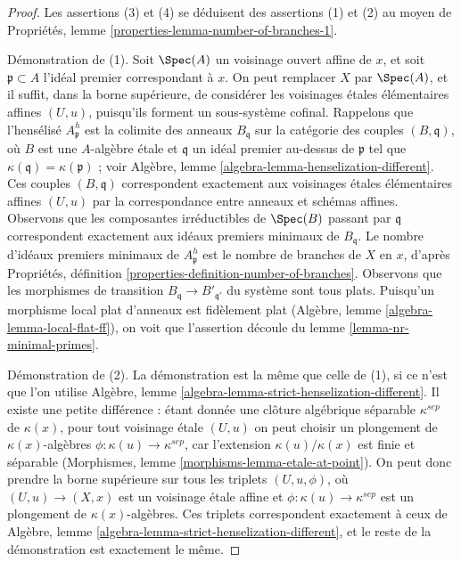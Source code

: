 \begin{proof}
Les assertions (3) et (4) se déduisent des assertions (1) et (2) au moyen de
Propriétés, lemme \ref{properties-lemma-number-of-branches-1}.

\medskip\noindent
Démonstration de (1). Soit $\Spec(A)$ un voisinage ouvert affine
de $x$, et soit $\mathfrak p \subset A$ l'idéal premier
correspondant à $x$. On peut remplacer $X$ par $\Spec(A)$, et
il suffit, dans la borne supérieure, de considérer les voisinages \'etales élémentaires affines
$(U, u)$, puisqu'ils forment un sous-système cofinal.
Rappelons que l'hensélisé $A_\mathfrak p^h$
est la colimite des anneaux $B_\mathfrak q$ sur la catégorie
des couples $(B, \mathfrak q)$, où $B$ est une $A$-algèbre \'etale
et $\mathfrak q$ un idéal premier au-dessus de $\mathfrak p$ tel que
$\kappa(\mathfrak q) = \kappa(\mathfrak p)$ ; voir
Algèbre, lemme \ref{algebra-lemma-henselization-different}.
Ces couples $(B, \mathfrak q)$ correspondent exactement aux
voisinages \'etales élémentaires affines $(U, u)$
par la correspondance entre anneaux et schémas affines.
Observons que les composantes irréductibles de $\Spec(B)$
passant par $\mathfrak q$ correspondent exactement aux idéaux
premiers minimaux de $B_\mathfrak q$. Le nombre d'idéaux premiers
minimaux de $A_\mathfrak p^h$ est le nombre de branches
de $X$ en $x$, d'après Propriétés, définition
\ref{properties-definition-number-of-branches}.
Observons que les morphismes de transition
$B_\mathfrak q \to B'_{\mathfrak q'}$ du système
sont tous plats. Puisqu'un morphisme local plat d'anneaux est fidèlement plat
(Algèbre, lemme \ref{algebra-lemma-local-flat-ff}),
on voit que l'assertion découle du
lemme \ref{lemma-nr-minimal-primes}.

\medskip\noindent
Démonstration de (2). La démonstration est la même que celle de (1), si ce n'est que l'on utilise
Algèbre, lemme \ref{algebra-lemma-strict-henselization-different}.
Il existe une petite différence : étant donnée une clôture algébrique séparable
$\kappa^{sep}$ de $\kappa(x)$, pour tout voisinage \'etale
$(U, u)$ on peut choisir un plongement de $\kappa(x)$-algèbres
$\phi : \kappa(u) \to \kappa^{sep}$,
car l'extension $\kappa(u)/\kappa(x)$ est finie et séparable
(Morphismes, lemme \ref{morphisms-lemma-etale-at-point}).
On peut donc prendre la borne supérieure sur tous les triplets
$(U, u, \phi)$, où $(U, u) \to (X, x)$ est un voisinage
\'etale affine et $\phi : \kappa(u) \to \kappa^{sep}$
est un plongement de $\kappa(x)$-algèbres. Ces triplets correspondent
exactement à ceux de
Algèbre, lemme \ref{algebra-lemma-strict-henselization-different},
et le reste de la démonstration est exactement le même.
\end{proof}

